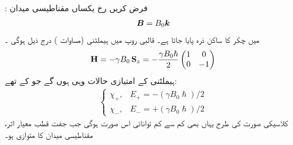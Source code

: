 :\quad
 فرض کریں  رخ  یکساں مقناطیسی میدان 
\begin{align}
{\ensuremath{{\boldsymbol{B}}}} = B_0 {\boldsymbol{k}}
\end{align}
میں  چکر کا ساکن ذرہ پایا جاتا ہے۔ قالبی روپ میں ہیملٹنی (مساوات  )  درج ذیل ہوگی ۔
\begin{align}
\operatorname{\mathbf{H}} = - \gamma B_0 \operatorname{\mathbf{S}}_z = - \frac{\gamma B_0 \hslash}{2}
\begin{pmatrix}
1 & 0 \\
0 & -1
\end{pmatrix}
\end{align}
ہیملٹنی  کے امتیازی حالات وہی ہوں گے جو  کے تھے: 
\begin{align}\label{مساوات_تین_ابعادی_تونائیاں_شائے}
\begin{cases}
\chi_{+} , & E_{+} = - (\gamma B_0 \hslash)/2 \\
\chi_{-} , & E_{-} = + (\gamma B_0 \hslash)/2
\end{cases}
\end{align}
کلاسیکی صورت کی طرح یہاں بھی کم سے کم توانائی اس صورت ہوگی جب جفت قطب  معیار اثر،  مقناطیسی میدان کا متوازی ہو۔

